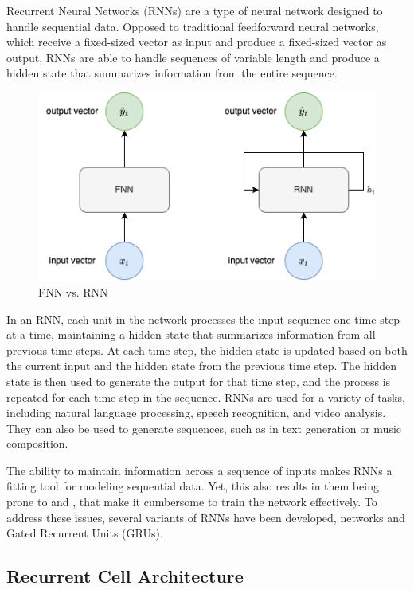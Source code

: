         Recurrent Neural Networks (RNNs) are a type of neural network designed to handle sequential data.
        Opposed to traditional feedforward neural networks, which receive a fixed-sized vector as input and produce a fixed-sized vector as output, 
        RNNs are able to handle sequences of variable length and produce a hidden state that summarizes information from the entire sequence.
        \begin{figure}[h!]
            \centering
            \includegraphics[scale=0.5]{figures/FNN_vs_RNN.drawio.png}
            \caption{FNN vs. RNN}
            \label{fig:fnn-vs-rnn}
        \end{figure}
        In an RNN, each unit in the network processes the input sequence one time step at a time, maintaining a hidden state that summarizes information from all previous time steps. At each time step, the hidden state is updated based on both the current input and the hidden state from the previous time step. The hidden state is then used to generate the output for that time step, and the process is repeated for each time step in the sequence.
        RNNs are used for a variety of tasks, including natural language processing, speech recognition, and video analysis. They can also be used to generate sequences, such as in text generation or music composition.

        The ability to maintain information across a sequence of inputs makes RNNs a fitting tool for modeling sequential data.
        Yet, this also results in them being prone to  and , that make it cumbersome to train the network effectively. 
        To address these issues, several variants of RNNs have been developed,  networks and Gated Recurrent Units (GRUs).
        
        
        \subsection{Recurrent Cell Architecture}
        \label{sec:recurrent-cell-architecture-background}

